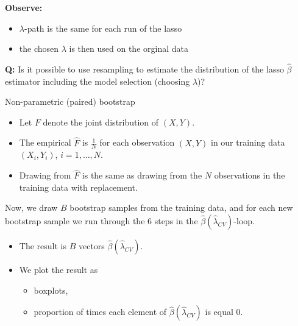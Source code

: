 \documentclass[
  ignorenonframetext,
]{beamer}
\providecommand{\tightlist}{%
  \setlength{\itemsep}{0pt}\setlength{\parskip}{0pt}}
\begin{document}
\begin{frame}

\textbf{Observe:}

\begin{itemize}
\tightlist
\item
  \(\lambda\)-path is the same for each run of the lasso
\item
  the chosen \(\lambda\) is then used on the orginal data
\end{itemize}

\textbf{Q:} Is it possible to use resampling to estimate the
distribution of the lasso \(\hat{\beta}\) estimator including the model
selection (choosing \(\lambda\))?

\end{frame}

\begin{frame}

\begin{block}{Non-parametric (paired) bootstrap}

\begin{itemize}
\tightlist
\item
  Let \(F\) denote the joint distribution of \((X,Y)\).
\item
  The empirical \(\hat{F}\) is \(\frac{1}{N}\) for each observation
  \((X,Y)\) in our training data \((X_i,Y_i)\), \(i=1,\ldots,N\).
\item
  Drawing from \(\hat{F}\) is the same as drawing from the \(N\)
  observations in the training data with replacement.
\end{itemize}

Now, we draw \(B\) bootstrap samples from the training data, and for
each new bootstrap sample we run through the 6 steps in the
\(\hat{\beta}(\hat{\lambda}_{CV})\)-loop.

\begin{itemize}
\tightlist
\item
  The result is \(B\) vectors \(\hat{\beta}(\hat{\lambda}_{CV})\).
\item
  We plot the result as

  \begin{itemize}
  \tightlist
  \item
    boxplots,
  \item
    proportion of times each element of
    \(\hat{\beta}(\hat{\lambda}_{CV})\) is equal 0.
  \end{itemize}
\end{itemize}

\end{block}

\end{frame}
\end{document}
